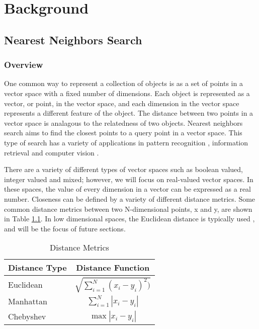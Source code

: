 \chapter{Background} %

\label{Background} %


\section{Nearest Neighbors Search}

\subsection{Overview}

One common way to represent a collection of objects is as a set of points in a vector space with a fixed number of dimensions.  Each object is represented as a vector, or point, in the vector space, and each dimension in the vector space represents a different feature of the object.  The distance between two points in a vector space is analagous to the relatedness of two objects.  Nearest neighbors search aims to find the closest points to a query point in a vector space.  This type of search has a variety of applications in pattern recognition \citep{cover1967nearest}, information retrieval \citep{manning2008introduction} and computer vision \citep{boiman2008defense}.

There are a variety of different types of vector spaces such as boolean valued, integer valued and mixed; however, we will focus on real-valued vector spaces.  In these spaces, the value of every dimension in a vector can be expressed as a real number.  Closeness can be defined by a variety of different distance metrics.  Some common distance metrics between two N-dimensional points, x and y, are shown in Table \ref{table:distancemet}.  In low dimensional spaces, the Euclidean distance is typically used \citep{danielsson1980euclidean}, and will be the focus of future sections.

\begin{table}
\centering
\begin{tabular}{ | l | c |}
	\hline
	Distance Type & Distance Function \\
	\hline
	Euclidean & $\sqrt{\sum\limits_{i=1}^N (x_i - y_i)^2)}$ \\
	\hline
	Manhattan & $\sum\limits_{i=1}^N |x_i - y_i|$ \\
	\hline
	Chebyshev & $\max{|x_i - y_i|}$ \\
	\hline
\end{tabular}
\caption{Distance Metrics}
\label{table:distancemet}
\end{table}

